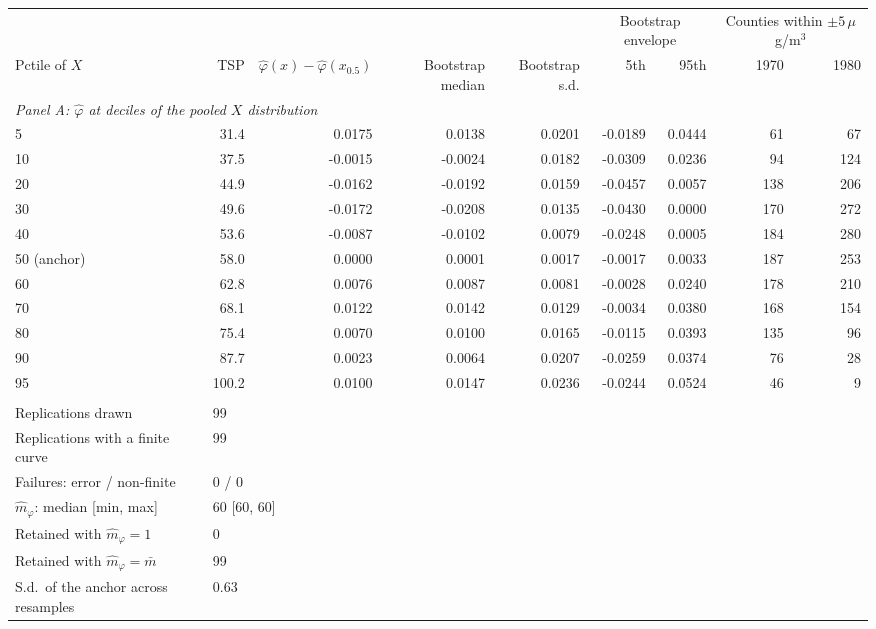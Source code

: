 \begin{tabular}{lrrrrrrrr}
\toprule
& & & & & \multicolumn{2}{c}{Bootstrap envelope} & \multicolumn{2}{c}{Counties within $\pm5\,\mu$g/m$^3$} \\
\cmidrule(lr){6-7} \cmidrule(lr){8-9}
Pctile of $X$ & TSP & $\hat\varphi(x)-\hat\varphi(x_{0.5})$ & Bootstrap median & Bootstrap s.d. & 5th & 95th & 1970 & 1980 \\
\midrule
\multicolumn{9}{l}{\textit{Panel A: $\hat\varphi$ at deciles of the pooled $X$ distribution}} \\
\midrule
5 & 31.4 & 0.0175 & 0.0138 & 0.0201 & -0.0189 & 0.0444 & 61 & 67 \\
10 & 37.5 & -0.0015 & -0.0024 & 0.0182 & -0.0309 & 0.0236 & 94 & 124 \\
20 & 44.9 & -0.0162 & -0.0192 & 0.0159 & -0.0457 & 0.0057 & 138 & 206 \\
30 & 49.6 & -0.0172 & -0.0208 & 0.0135 & -0.0430 & 0.0000 & 170 & 272 \\
40 & 53.6 & -0.0087 & -0.0102 & 0.0079 & -0.0248 & 0.0005 & 184 & 280 \\
50 (anchor) & 58.0 & 0.0000 & 0.0001 & 0.0017 & -0.0017 & 0.0033 & 187 & 253 \\
60 & 62.8 & 0.0076 & 0.0087 & 0.0081 & -0.0028 & 0.0240 & 178 & 210 \\
70 & 68.1 & 0.0122 & 0.0142 & 0.0129 & -0.0034 & 0.0380 & 168 & 154 \\
80 & 75.4 & 0.0070 & 0.0100 & 0.0165 & -0.0115 & 0.0393 & 135 & 96 \\
90 & 87.7 & 0.0023 & 0.0064 & 0.0207 & -0.0259 & 0.0374 & 76 & 28 \\
95 & 100.2 & 0.0100 & 0.0147 & 0.0236 & -0.0244 & 0.0524 & 46 & 9 \\
\addlinespace
\multicolumn{9}{l}{\textit{Panel B: bootstrap design and convergence}} \\
\midrule
Replications drawn & \multicolumn{8}{l}{99} \\
Replications with a finite curve & \multicolumn{8}{l}{99} \\
Failures: error / non-finite & \multicolumn{8}{l}{0 / 0} \\
$\hat m_\varphi$: median [min, max] & \multicolumn{8}{l}{60 [60, 60]} \\
Retained with $\hat m_\varphi = 1$ & \multicolumn{8}{l}{0} \\
Retained with $\hat m_\varphi = \bar m$ & \multicolumn{8}{l}{99} \\
S.d.\ of the anchor across resamples & \multicolumn{8}{l}{0.63} \\

\end{tabular}
